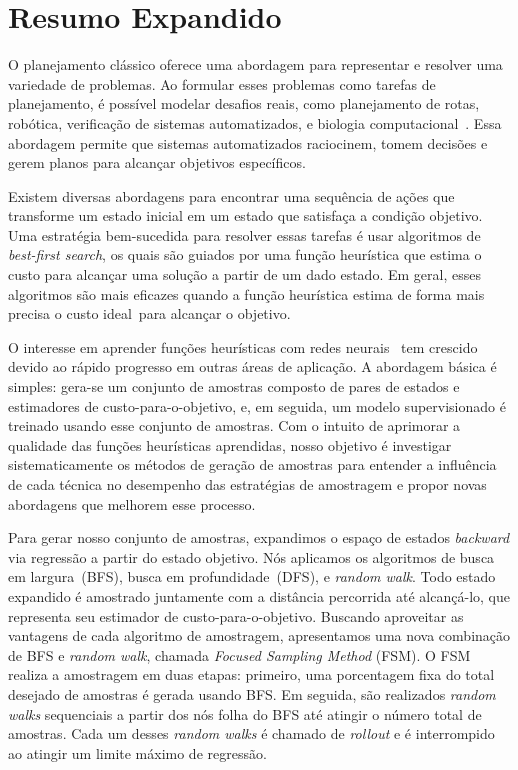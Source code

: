 \appendix

\chapter{Resumo Expandido}
\label{sec:resumo_expandido}

O planejamento clássico oferece uma abordagem para representar e resolver uma variedade de problemas. Ao formular esses problemas como tarefas de planejamento, é possível modelar desafios reais, como planejamento de rotas, robótica, verificação de sistemas automatizados, e biologia computacional~\cite{edelkamp2012heuristic}. Essa abordagem permite que sistemas automatizados raciocinem, tomem decisões e gerem planos para alcançar objetivos específicos.

Existem diversas abordagens para encontrar uma sequência de ações que transforme um estado inicial em um estado que satisfaça a condição objetivo. Uma estratégia bem-sucedida para resolver essas tarefas é usar algoritmos de \textit{best-first search}, os quais são guiados por uma função heurística que estima o custo para alcançar uma solução a partir de um dado estado. Em geral, esses algoritmos são mais eficazes quando a função heurística estima de forma mais precisa o custo ideal~\hstar para alcançar o objetivo.

O interesse em aprender funções heurísticas com redes neurais~\cite{yu2020learning,shen2020learning,ferber2020neural,toyer2020asnets,ferber2022neural,otoole2022sampling} tem crescido devido ao rápido progresso em outras áreas de aplicação. A abordagem básica é simples: gera-se um conjunto de amostras composto de pares de estados e estimadores de custo-para-o-objetivo, e, em seguida, um modelo supervisionado é treinado usando esse conjunto de amostras. Com o intuito de aprimorar a qualidade das funções heurísticas aprendidas, nosso objetivo é investigar sistematicamente os métodos de geração de amostras para entender a influência de cada técnica no desempenho das estratégias de amostragem e propor novas abordagens que melhorem esse processo.

Para gerar nosso conjunto de amostras, expandimos o espaço de estados \textit{backward} via regressão a partir do estado objetivo. Nós aplicamos os algoritmos de busca em largura~(BFS), busca em profundidade~(DFS), e \textit{random walk}. Todo estado expandido é amostrado juntamente com a distância percorrida até alcançá-lo, que representa seu estimador de custo-para-o-objetivo. Buscando aproveitar as vantagens de cada algoritmo de amostragem, apresentamos uma nova combinação de BFS e \textit{random walk}, chamada \textit{Focused Sampling Method} (FSM). O FSM realiza a amostragem em duas etapas: primeiro, uma porcentagem fixa do total desejado de amostras é gerada usando BFS. Em seguida, são realizados \textit{random walks} sequenciais a partir dos nós folha do BFS até atingir o número total de amostras. Cada um desses \textit{random walks} é chamado de \textit{rollout} e é interrompido ao atingir um limite máximo de regressão.

